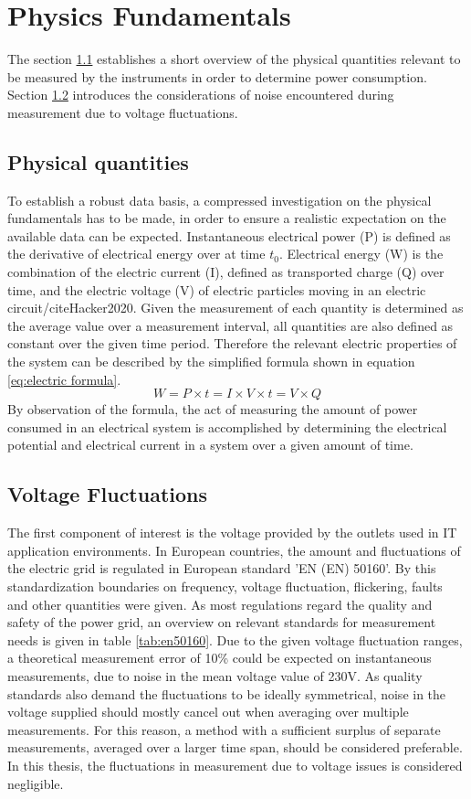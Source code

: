 \chapter{Physics Fundamentals}\label{chap:fundamentals}
The section \ref{sec:measurement} establishes a short overview of the physical quantities relevant to be measured by the instruments in order to determine power consumption. Section \ref{sec:vflux} introduces the considerations of noise encountered during measurement due to voltage fluctuations. 
\section{Physical quantities}\label{sec:measurement}
To establish a robust data basis, a compressed investigation on the physical fundamentals has to be made, in order to ensure a realistic expectation on the available data can be expected.
Instantaneous electrical power (P) is defined as the derivative of electrical energy over at time $t_{0}$. Electrical energy (W) is the combination of the electric current (I), defined as transported charge (Q) over time, and the electric voltage (V) of electric particles moving in an electric circuit/cite{Hacker2020}. Given the measurement of each quantity is determined as the average value over a measurement interval, all quantities are also defined as constant over the given time period. Therefore the relevant electric properties of the system can be described by the simplified formula shown in equation \ref{eq:electric formula}. 
\begin{equation}
	W = P \times t = I\times V \times t = V \times Q
	\label{eq:electric formula}
\end{equation}
By observation of the formula, the act of measuring the amount of power consumed in an electrical system is accomplished by determining the electrical potential and electrical current in a system over a given amount of time.

\section{Voltage Fluctuations}\label{sec:vflux}
The first component of interest is the voltage provided by the outlets used in IT application environments. In European countries, the amount and fluctuations of the electric grid is regulated in European standard '\gls{EN} (EN) 50160'.
By this standardization boundaries on frequency, voltage fluctuation, flickering, faults and other quantities were given. As most regulations regard the quality and safety of the power grid, an overview on relevant standards for measurement needs is given in table \ref{tab:en50160}. Due to the given voltage fluctuation ranges, a theoretical measurement error of 10\% could be expected on instantaneous measurements, due to noise in the mean voltage value of 230V.  As quality standards also demand the fluctuations to be ideally symmetrical, noise in the voltage supplied should mostly cancel out when averaging over multiple measurements.
For this reason, a method with a sufficient surplus of separate measurements, averaged over a larger time span, should be considered preferable. In this thesis, the fluctuations in measurement due to voltage issues is considered negligible.

